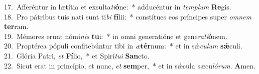 {17.~}Afferéntur in lætítia et exsulta\textit{ti}\textbf{ó}ne:~* adducéntur in \textit{tem}\textit{plum} \textbf{Re}gis.\\
{18.~}Pro pátribus tuis nati sunt ti\textit{bi} \textbf{fí}lii:~* constítues eos príncipes super \textit{om}\textit{nem} \textbf{ter}ram.\\
{19.~}Mémores erunt nómi\textit{nis} \textbf{tu}i:~* in omni generatióne et gene\textit{ra}\textit{ti}\textbf{ó}nem.\\
{20.~}Proptérea pópuli confitebúntur tibi in \textit{æ}\textbf{tér}num:~* et in sǽ\textit{cu}\textit{lum} \textbf{sǽ}culi.\\
{21.~}Glória Patri, \textit{et} \textbf{Fí}lio,~* et Spirí\textit{tu}\textit{i} \textbf{San}cto.\\
{22.~}Sicut erat in princípio, et nunc, \textit{et} \textbf{sem}per,~* et in sǽcula sæcu\textit{ló}\textit{rum}. \textbf{A}men.\\

